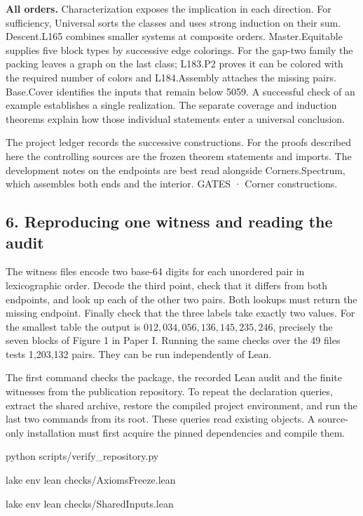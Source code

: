 \documentclass[english,11pt,a4paper]{article}
\begin{document}
\textbf{All orders.} Characterization exposes the implication in each direction. For sufficiency, Universal sorts the classes and uses strong induction on their sum. Descent.L165 combines smaller systems at composite orders. Master.Equitable supplies five block types by successive edge colorings. For the gap-two family the packing leaves a graph on the last class; L183.P2 proves it can be colored with the required number of colors and L184.Assembly attaches the missing pairs. Base.Cover identifies the inputs that remain below 5059. A successful check of an example establishes a single realization. The separate coverage and induction theorems explain how those individual statements enter a universal conclusion.

The project ledger records the successive constructions. For the proofs described here the controlling sources are the frozen theorem statements and imports. The development notes on the endpoints are best read alongside Corners.Spectrum, which assembles both ends and the interior. GATES · Corner constructions.

\subsection{6. Reproducing one witness and reading the audit}\label{reproducing-one-witness-and-reading-the-audit}

The witness files encode two base-64 digits for each unordered pair in lexicographic order. Decode the third point, check that it differs from both endpoints, and look up each of the other two pairs. Both lookups must return the missing endpoint. Finally check that the three labels take exactly two values. For the smallest table the output is \(012,034,056,136,145,235,246\), precisely the seven blocks of Figure 1 in Paper I. Running the same checks over the 49 files tests 1,203,132 pairs. They can be run independently of Lean.

The first command checks the package, the recorded Lean audit and the finite witnesses from the publication repository. To repeat the declaration queries, extract the shared archive, restore the compiled project environment, and run the last two commands from its root. These queries read existing objects. A source-only installation must first acquire the pinned dependencies and compile them.

\begingroup\small\ttfamily\raggedright 
\noindent\hspace*{0.0em}python scripts/verify\_\allowbreak{}repository.py\par
\noindent\hspace*{0.0em}lake env lean checks/AxiomsFreeze.lean\par
\noindent\hspace*{0.0em}lake env lean checks/SharedInputs.lean\par\endgroup
\end{document}
